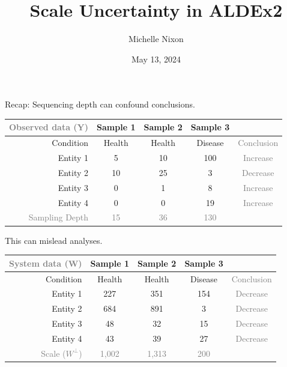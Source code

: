 \documentclass[
  ignorenonframetext,
]{beamer}
\title{Scale Uncertainty in ALDEx2}
\author{Michelle Nixon}
\date{May 13, 2024}
\begin{document}
\frame{\titlepage}

\begin{frame}{Recap: Sequencing depth can confound conclusions.}
\protect\hypertarget{recap-sequencing-depth-can-confound-conclusions.}{}
\begin{table}[h!]
\centering
\begin{tabular}{|r|c c c| c|}
\hline
\textcolor{gray}{Observed data (Y)} & Sample 1 & Sample 2 & Sample 3  &\\
\hline
Condition & Health & Health & Disease & \textcolor{gray}{Conclusion}\\
\hline
Entity 1 & 5 & 10 & 100 & \textcolor{gray}{Increase}\\
Entity 2 & 10 & 25 & 3 & \textcolor{gray}{Decrease}\\
Entity 3 & 0 & 1 & 8 & \textcolor{gray}{Increase}\\
Entity 4 & 0 & 0 & 19 &\textcolor{gray}{Increase}\\
\hline
\textcolor{gray}{Sampling Depth} & \textcolor{gray}{15} & \textcolor{gray}{36} & \textcolor{gray}{130} &\\
\hline
\end{tabular}
\end{table}
\end{frame}

\begin{frame}{This can mislead analyses.}
\protect\hypertarget{this-can-mislead-analyses.}{}
\begin{table}[h!]
\centering
\begin{tabular}{|r|c c c| c|}
\hline
\textcolor{gray}{System data (W)} & Sample 1 & Sample 2 & Sample 3  & \\
\hline
Condition & Health & Health & Disease & \textcolor{gray}{Conclusion}\\
\hline
Entity 1 & 227 & 351 & 154 & \textcolor{gray}{Decrease}\\
Entity 2 & 684 & 891 & 3 & \textcolor{gray}{Decrease}\\
Entity 3 & 48 & 32 & 15 & \textcolor{gray}{Decrease}\\
Entity 4 & 43 & 39  & 27 &\textcolor{gray}{Decrease}\\
\hline
\textcolor{gray}{Scale ($W^\perp$)} & \textcolor{gray}{1,002} & \textcolor{gray}{1,313} & \textcolor{gray}{200} &\\
\hline
\end{tabular}
\end{table}
\end{frame}
\end{document}

